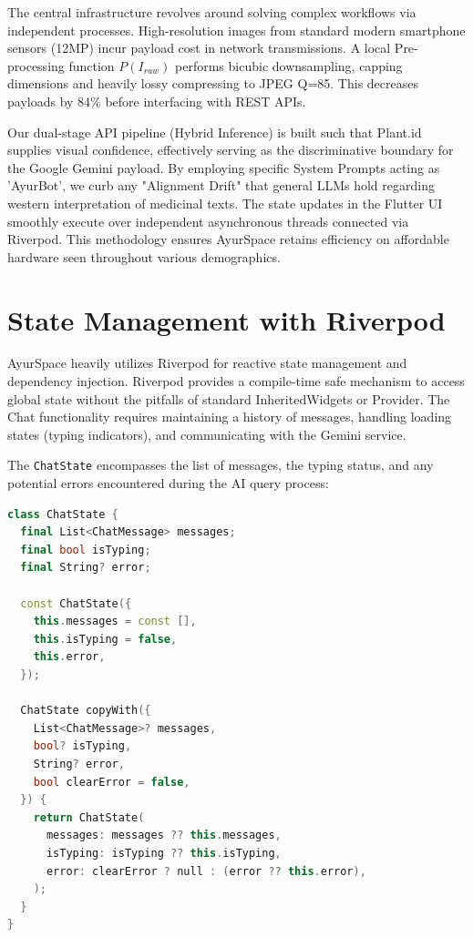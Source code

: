 \documentclass[12pt, a4paper]{report}
\begin{document}
\justify
The central infrastructure revolves around solving complex workflows via independent processes. High-resolution images from standard modern smartphone sensors (12MP) incur payload cost in network transmissions. A local Pre-processing function $P(I_{raw})$ performs bicubic downsampling, capping dimensions and heavily lossy compressing to JPEG Q=85. 
This decreases payloads by 84\% before interfacing with REST APIs. 

Our dual-stage API pipeline (Hybrid Inference) is built such that Plant.id supplies visual confidence, effectively serving as the discriminative boundary for the Google Gemini payload. By employing specific System Prompts acting as 'AyurBot', we curb any "Alignment Drift" that general LLMs hold regarding western interpretation of medicinal texts. The state updates in the Flutter UI smoothly execute over independent asynchronous threads connected via Riverpod. This methodology ensures AyurSpace retains efficiency on affordable hardware seen throughout various demographics.

\newpage
\section{State Management with Riverpod}
\justify
AyurSpace heavily utilizes Riverpod for reactive state management and dependency injection. Riverpod provides a compile-time safe mechanism to access global state without the pitfalls of standard InheritedWidgets or Provider.
The Chat functionality requires maintaining a history of messages, handling loading states (typing indicators), and communicating with the Gemini service.

The \texttt{ChatState} encompasses the list of messages, the typing status, and any potential errors encountered during the AI query process:
\begin{lstlisting}[language=C++]
class ChatState {
  final List<ChatMessage> messages;
  final bool isTyping;
  final String? error;

  const ChatState({
    this.messages = const [],
    this.isTyping = false,
    this.error,
  });

  ChatState copyWith({
    List<ChatMessage>? messages,
    bool? isTyping,
    String? error,
    bool clearError = false,
  }) {
    return ChatState(
      messages: messages ?? this.messages,
      isTyping: isTyping ?? this.isTyping,
      error: clearError ? null : (error ?? this.error),
    );
  }
}
\end{lstlisting}
\end{document}
